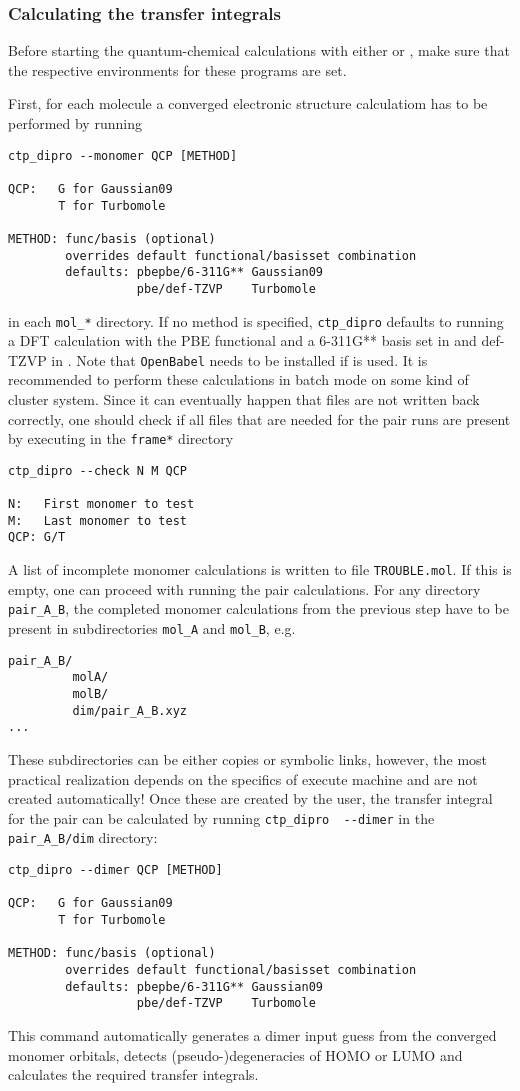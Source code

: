\subsubsection{Calculating the transfer integrals}
Before starting the quantum-chemical calculations with either \gaussian or \turbomole, make sure that the respective environments for these programs are set. 

First, for each molecule a converged electronic structure calculatiom has to be performed by running 
\begin{verbatim}
ctp_dipro --monomer QCP [METHOD]

QCP:   G for Gaussian09
       T for Turbomole

METHOD: func/basis (optional)
        overrides default functional/basisset combination
        defaults: pbepbe/6-311G** Gaussian09
                  pbe/def-TZVP    Turbomole
\end{verbatim}
in each {\tt mol\_*} directory. If no method is specified, {\tt ctp\_dipro} defaults to running a DFT calculation with the PBE functional and a 6-311G** basis set in \gaussian and def-TZVP in \turbomole. Note that {\tt OpenBabel} needs to be installed if \turbomole is used. It is recommended to perform these calculations in batch mode on some kind of cluster system. Since it can eventually happen that files are not written back correctly, one should check if all files that are needed for the pair runs are present by executing in the {\tt frame*} directory
\begin{verbatim}
ctp_dipro --check N M QCP

N:   First monomer to test
M:   Last monomer to test
QCP: G/T 
\end{verbatim}
A list of incomplete monomer calculations is written to file {\tt TROUBLE.mol}. If this is empty, one can proceed with running the pair calculations. For any directory {\tt pair\_A\_B}, the completed monomer calculations from the previous step have to be present in subdirectories {\tt mol\_A} and {\tt mol\_B}, e.g.
\begin{verbatim}
pair_A_B/
         molA/
         molB/
         dim/pair_A_B.xyz
...
\end{verbatim}
These subdirectories can be either copies or symbolic links, however, the most practical realization depends on the specifics of execute machine and are not created automatically! Once these are created by the user, the transfer integral for the pair can be calculated by running {\tt ctp\_dipro { -}-dimer} in the {\tt pair\_A\_B/dim} directory:
 \begin{verbatim}
ctp_dipro --dimer QCP [METHOD]

QCP:   G for Gaussian09
       T for Turbomole

METHOD: func/basis (optional)
        overrides default functional/basisset combination
        defaults: pbepbe/6-311G** Gaussian09
                  pbe/def-TZVP    Turbomole
\end{verbatim}
This command automatically generates a dimer input guess from the converged monomer orbitals, detects (pseudo-)degeneracies of HOMO or LUMO and calculates the required transfer integrals. 

